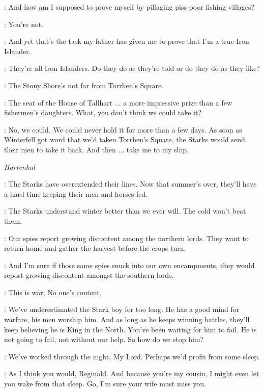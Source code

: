 \THEON: And how am I supposed to prove myself by pillaging piss-poor fishing villages? 

\DAGMER: You're not. 

\THEON: And yet that's the task my father has given me to prove that I'm a true Iron Islander. 

\DAGMER: They're all Iron Islanders. Do they do as they're told or do they do as they like? 

\THEON: The Stony Shore's not far from Torrhen's Square. 

\DAGMER: The seat of the House of Tallhart $\ldots$ a more impressive prize than a few fishermen's daughters. What, you don't think we could take it? 

\THEON: No, we could. We could never hold it for more than a few days. As soon as Winterfell got word that we'd taken Torrhen's Square, the Starks would send their men to take it back. And then $\ldots$ take me to my ship. 


\scene

\textit{Harrenhal} 


\REGINALD: The Starks have overextended their lines. Now that summer's over, they'll have a hard time keeping their men and horses fed. 

\TYWIN: The Starks understand winter better than we ever will. The cold won't beat them. 

\AMORY: Our spies report growing discontent among the northern lords. They want to return home and gather the harvest before the crops turn. 

\TYWIN: And I'm sure if those same spies snuck into our own encampments, they would report growing discontent amongst the southern lords. 

\REGINALD: This is war; No one's content. 

\TYWIN: We've underestimated the Stark boy for too long. He has a good mind for warfare, his men worship him. And as long as he keeps winning battles, they'll keep believing he is King in the North. You've been waiting for him to fail. He is not going to fail, not without our help. So how do we stop him? 

\REGINALD: We've worked through the night, My Lord. Perhaps we'd profit from some sleep. 

\TYWIN: As I think you would, Reginald. And because you're my cousin, I might even let you wake from that sleep. Go, I'm sure your wife must miss you. 

